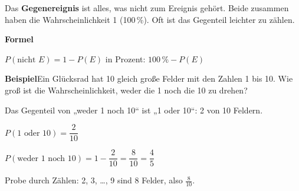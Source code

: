 \documentclass[11pt]{article}
\newlength{\kr}
\begin{document}
\ifdim\kr>12mm\noindent{\scriptsize\color{mbgrau}Platz zum Rechnen}\par\nointerlineskip\vspace{1mm}\noindent
\begin{tikzpicture}\clip (0,0) rectangle ({\linewidth-0.5mm},\kr);\draw[black!16,line width=0.3pt,step=5mm] (0,0) grid (\linewidth,\kr);\end{tikzpicture}\fi\par
\clearpage\label{s:C}\noindent\colorbox{black!12}{}\hspace{3mm}{\Large\bfseries Gegenereignis: „nicht“ und „weder … noch“}\par\smallskip
\noindent Das \textbf{Gegenereignis} ist alles, was nicht zum Ereignis gehört. Beide zusammen haben die Wahrscheinlichkeit 1 (100\,\%). Oft ist das Gegenteil leichter zu zählen.\par\medskip
\noindent\textbf{Formel}\par\nopagebreak\noindent\hspace*{4mm}\begin{minipage}{\dimexpr\linewidth-4mm\relax}$P(\text{nicht } E) = 1 - P(E)$ \qquad in Prozent: $100\,\% - P(E)$\end{minipage}\par\medskip
\noindent\textbf{Beispiel}\quad Ein Glücksrad hat 10 gleich große Felder mit den Zahlen 1 bis 10. Wie groß ist die Wahrscheinlichkeit, weder die 1 noch die 10 zu drehen?\par\smallskip
\noindent\begin{minipage}[t]{0.6\linewidth}\vspace{0pt}\par\noindent{}Das Gegenteil von „weder 1 noch 10“ ist „1 oder 10“: 2 von 10 Feldern.\par\smallskip\par\noindent{}$P(1 \text{ oder } 10) = \dfrac{2}{10}$\par\smallskip\par\noindent{}$P(\text{weder 1 noch 10}) = 1 - \dfrac{2}{10} = \dfrac{8}{10} = \dfrac{4}{5}$\par\smallskip\par\noindent{}Probe durch Zählen: 2, 3, \ldots, 9 sind 8 Felder, also $\frac{8}{10}$.\par\smallskip\end{minipage}\hfill
\end{document}
